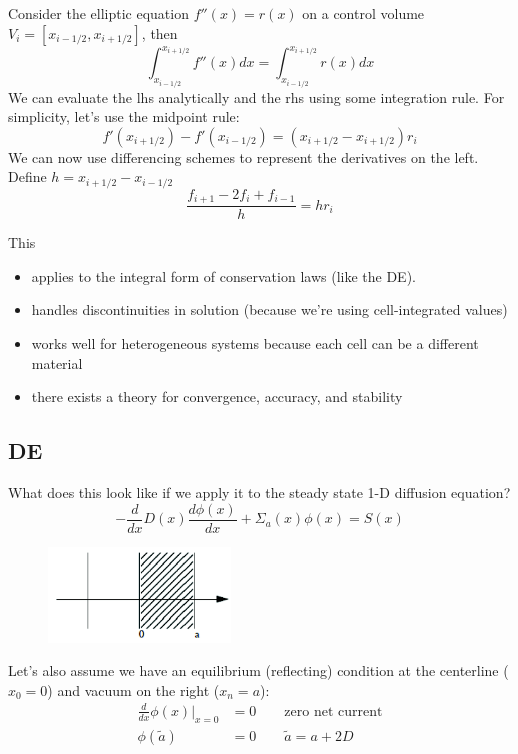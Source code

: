 \documentclass[12pt]{article}
\begin{document}
Consider the elliptic equation $f''(x) = r(x)$ on a control volume $V_i = [x_{i-1/2}, x_{i+1/2}]$, then
\[\int_{x_{i-1/2}}^{x_{i+1/2}} f''(x)dx = \int_{x_{i-1/2}}^{x_{i+1/2}} r(x) dx\]
%
We can evaluate the lhs analytically and the rhs using some integration rule. For simplicity, let's use the midpoint rule:
%
\[f'(x_{i+1/2}) - f'(x_{i-1/2}) = (x_{i+1/2} - x_{i+1/2})r_i\]
%
We can now use differencing schemes to represent the derivatives on the left. Define $h = x_{i+1/2} - x_{i-1/2}$
\[\frac{f_{i+1} - 2f_i + f_{i-1}}{h} = hr_i\]

This
\begin{itemize}
\item applies to the integral form of conservation laws (like the DE).
\item handles discontinuities in solution (because we're using cell-integrated values)
\item works well for heterogeneous systems because each cell can be a different material
\item there exists a theory for convergence, accuracy, and stability
\end{itemize}


\subsection{DE} 
What does this look like if we apply it to the steady state 1-D diffusion equation?
\[-\frac{d}{dx}D(x)\frac{d \phi(x)}{dx} + \Sigma_a(x) \phi(x) = S(x)\]
%
\begin{figure}[h!]
\includegraphics[height=1in]{FVM-fig}
\end{figure}
%
Let's also assume we have an equilibrium (reflecting) condition at the centerline ($x_0 = 0$) and vacuum on the right ($x_n = a$):
\begin{align}
\frac{d}{dx}\phi(x) \big|_{x=0} &= 0 \qquad \text{zero net current} \nonumber\\
\phi(\tilde{a}) &= 0 \qquad \tilde{a} = a + 2D \nonumber
\end{align}
\end{document}
